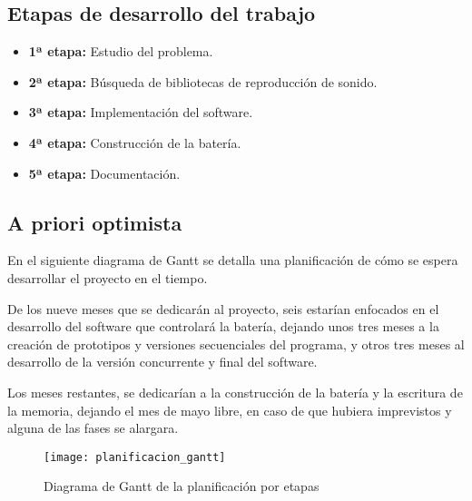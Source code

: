        \subsection{Etapas de desarrollo del trabajo} %
        \label{sub:EtapasDeDesarrolloDelTrabajo}

            \begin{itemize}
                \item \textbf{1ª etapa:} Estudio del problema.

                \item \textbf{2ª etapa:} Búsqueda de bibliotecas de reproducción de sonido.

                \item \textbf{3ª etapa:} Implementación del software.

                \item \textbf{4ª etapa:} Construcción de la batería.

                \item \textbf{5ª etapa:} Documentación.
            \end{itemize}


        \subsection{A priori optimista} %
        \label{sub:APrioriOptimista}

            En el siguiente diagrama de Gantt se detalla una planificación de cómo se espera desarrollar el proyecto en
            el tiempo.

            De los nueve meses que se dedicarán al proyecto, seis estarían enfocados en el desarrollo del
            software que controlará la batería, dejando unos tres meses a la creación de prototipos y versiones
            secuenciales del programa, y otros tres meses al desarrollo de la versión concurrente y final del software.

            Los meses restantes, se dedicarían a la construcción de la batería y la escritura de la memoria, dejando el
            mes de mayo libre, en caso de que hubiera imprevistos y alguna de las fases se alargara.

            \begin{figure}[ht]
                \centering
                \texttt{[image: planificacion\_gantt]}
                \caption{Diagrama de Gantt de la planificación por etapas\label{fig:PlanificacionGantt}}
            \end{figure}

